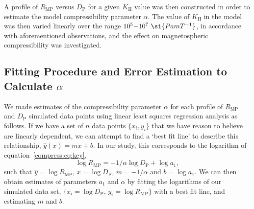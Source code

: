 A profile of $R_\mathrm{MP}$ versus $D_\mathrm{P}$ for a given $K_\mathrm{H}$ value was then constructed in order to estimate the model compressibility parameter $\alpha$. The value of $K_\mathrm{H}$ in the model was then varied linearly over the range $10^5{\--}10^7~\si{Pa m T^{-1}}$, in accordance with aforementioned  observations, and the effect on magnetospheric compressibility was investigated. 


\subsection{Fitting Procedure and Error Estimation to Calculate $\alpha$}
We made estimates of the compressibility parameter $\alpha$ for each profile of $R_\mathrm{MP}$ and $D_\mathrm{P}$ simulated data points using linear least squares regression analysis as follows. If we have a set of $n$ data points $\{x_i,y_i\}$ that we have reason to believe are linearly dependent, we can attempt to find a `best fit line' to describe this relationship, $\hat{y}(x) = mx + b$. In our study, this corresponds to the logarithm of equation~\ref{compress:eq:key},
\begin{equation}
\log{R_\mathrm{MP}}{=}-1/{\alpha}\log {D_\mathrm{P}}+\log{a_1},
\end{equation}
such that $\hat{y} = \log{R_\mathrm{MP}}$, $x =\log{D_\mathrm{P}}$, $ m = -1/\alpha$ and $b = \log{a_1}$. We can then obtain estimates of parameters $a_1$ and $\alpha$ by fitting the logarithms of our simulated data set, $\{x_i=\log{D_\mathrm{P}}$, $y_i=\log{R_\mathrm{MP}}\}$ with a best fit line, and estimating $m$ and $b$.

